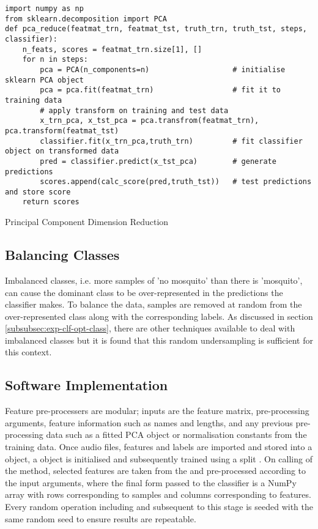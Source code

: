         \begin{listing}[ht]
            \begin{verbatim}
import numpy as np
from sklearn.decomposition import PCA
def pca_reduce(featmat_trn, featmat_tst, truth_trn, truth_tst, steps, classifier):
    n_feats, scores = featmat_trn.size[1], []
    for n in steps:
        pca = PCA(n_components=n)                   # initialise sklearn PCA object
        pca = pca.fit(featmat_trn)                  # fit it to training data
        # apply transform on training and test data
        x_trn_pca, x_tst_pca = pca.transfrom(featmat_trn), pca.transform(featmat_tst)
        classifier.fit(x_trn_pca,truth_trn)         # fit classifier object on transformed data
        pred = classifier.predict(x_tst_pca)        # generate predictions
        scores.append(calc_score(pred,truth_tst))   # test predictions and store score
    return scores
            \end{verbatim}
            \caption{Principal Component Dimension Reduction}
            \label{code:pl-featpreproc-sel-pca}
        \end{listing} 
    
    \subsection{Balancing Classes}
    \label{subsec:pl-featpreproc-bal}
        Imbalanced classes, i.e. more samples of 'no mosquito' than there is 'mosquito', can cause the dominant class to be over-represented in the predictions the classifier makes. To balance the data, samples are removed at random from the over-represented class along with the corresponding labels. As discussed in section \ref{subsubsec:exp-clf-opt-class}, there are other techniques available to deal with imbalanced classes but it is found that this random undersampling is sufficient for this context.
    
    \subsection{Software Implementation}
    \label{subsec:pl-featpreproc-software}
        Feature pre-processers are modular; inputs are the feature matrix, pre-processing arguments, feature information such as names and lengths, and any previous pre-processing data such as a fitted PCA object or normalisation constants from the training data.
        Once audio files, features and labels are imported and stored into a  object, a  object is initialised and subsequently trained using a split . On calling of the  method, selected features are taken from the  and pre-processed according to the input arguments, where the final form passed to the classifier is a NumPy array with rows corresponding to samples and columns corresponding to features. Every random operation including and subsequent to this stage is seeded with the same random seed to ensure results are repeatable.
    